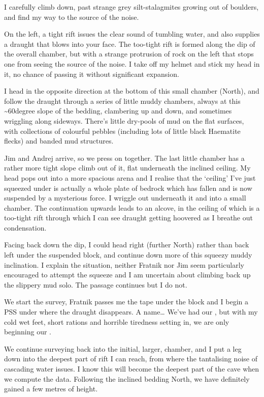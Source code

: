I carefully climb down, past strange grey silt-stalagmites growing out
of boulders, and find my way to the source of the noise.

On the left, a tight rift issues the clear sound of tumbling water, and
also supplies a draught that blows into your face. The too-tight rift is
formed along the dip of the overall chamber, but with a strange
protrusion of rock on the left that stops one from seeing the source of
the noise. I take off my helmet and stick my head in it, no chance of
passing it without significant expansion.

I head in the opposite direction at the bottom of this small chamber
(North), and follow the draught through a series of little muddy
chambers, always at this \textasciitilde 60degree slope of the bedding,
clambering up and down, and sometimes wriggling along sideways. There's
little dry-pools of mud on the flat surfaces, with collections of
colourful pebbles (including lots of little black Haematite flecks) and
banded mud structures.

Jim and Andrej arrive, so we press on together. The last little chamber
has a rather more tight slope climb out of it, flat underneath the
inclined ceiling. My head pops out into a more spacious arena and I
realise that the `ceiling' I've just squeezed under is actually a whole
plate of bedrock which has fallen and is now suspended by a mysterious
force. I wriggle out underneath it and into a small chamber. The
continuation upwards leads to an alcove, in the ceiling of which is a
too-tight rift through which I can see draught getting hoovered as I
breathe out condensation.

Facing back down the dip, I could head right (further North) rather than
back left under the suspended block, and continue down more of this
squeezy muddy inclination. I explain the situation, neither Fratnik nor
Jim seem particularly encouraged to attempt the squeeze and I am
uncertain about climbing back up the slippery mud solo. The passage
continues but I do not.

We start the survey, Fratnik passes me the tape under the block and I
begin a PSS under where the draught disappears. A name\ldots{} We've had
our , but with my cold wet feet, short rations and
horrible tiredness setting in, we are only beginning our .

We continue surveying back into the initial, larger, chamber, and I put
a leg down into the deepest part of rift I can reach, from where the
tantalising noise of cascading water issues. I know this will become the
deepest part of the cave when we compute the data. Following the
inclined bedding North, we have definitely gained a few metres of
height.

